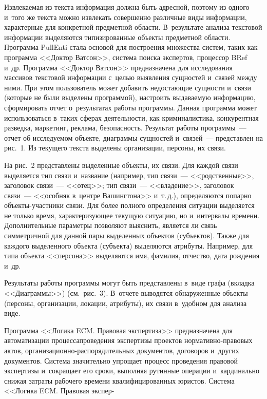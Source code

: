 \begin{multicols}{2}
Извлекаемая из текс\-та информация должна быть адресной, поэтому из 
одного и~того же текста можно извлекать совершенно различные виды 
информации, характерные для конкретной предметной об\-ласти. 
В~результате анализа текстовой информации выделяются типизированные 
объекты предметной об\-ласти. Программа PullEnti стала основой для 
построения множества сис\-тем, таких как программа <<Доктор Ватсон>>, 
система поиска экспертов, процессор BRef и~др. Программа <<Доктор 
Ватсон>> предназначена для исследования массивов текс\-то\-вой информации с~целью выявления сущностей и~связей между ними. При этом пользователь 
может добавить недостающие сущности и~связи (которые не были выделены 
программой), настроить выдаваемую информацию, сформировать отчет 
о~результатах работы программы. Данная программа может использоваться в~таких сферах деятельности, как криминалистика, конкурентная разведка, 
маркетинг, реклама, безопас\-ность. Результат работы программы~--- отчет об 
исследуемом объекте, диаграммы сущностей и~связей~--- пред\-став\-лен на 
рис.~1. Из текущего текста выделены организации, персоны, их связи.
   
   На рис.~2 представлены выделенные объекты, их связи. Для каждой связи 
выделяется тип связи и~название (например, тип связи~--- <<родственные>>, 
заголовок связи~--- <<отец>>; тип связи~--- <<владение>>, заголовок  
связи~--- <<особняк в~центре Вашингтона>> и~т.\,д.), определяются попарно 
объекты-участники связи. Для более полного определения ситуации 
выделяется не только время, характеризующее текущую ситуацию, но 
и~интервалы времени. Дополнительные параметры поз\-во\-ля\-ют выяснить, 
является ли связь симметричной для данной пары выделенных объектов 
(субъектов). Также для каж\-до\-го выделенного объекта (субъекта) выделяются 
атрибуты. Например, для типа объекта <<персона>> выделяются имя, 
фамилия, отчество, дата рождения и~др. 


   Результаты работы программы могут быть пред\-став\-ле\-ны в~виде графа 
(вкладка <<Диаграммы>>) (см.\ рис.~3). В~отчете выводятся обнаруженные 
объекты (персоны, организации, локации, атрибуты), их связи в~удоб\-ном для 
анализа виде.


   
   Программа <<Логика ECM. Правовая экспертиза>> предназначена для 
автоматизации процесса\linebreak проведения экспертизы проектов  
нор\-ма\-тив\-но-пра\-во\-вых актов,  
ор\-га\-ни\-за\-ци\-он\-но-рас\-по\-ря\-ди\-тель\-ных документов, договоров 
и~других документов. Сис\-те\-ма значительно упрощает процесс проведения 
правовой экспертизы и~сокращает его сроки, выполняя рутинные операции 
и~кардинально снижая за\-тра\-ты рабочего времени квалифицированных 
юристов. Сис\-те\-ма <<Логика ECM. Правовая экспер-\linebreak\vspace*{-12pt}

\pagebreak

\end{multicols}

